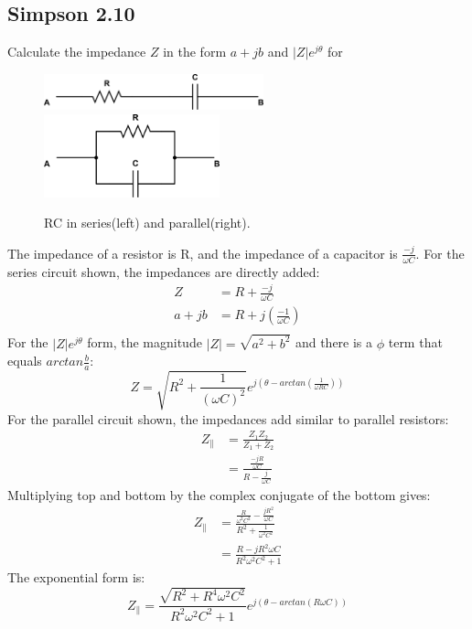 \documentclass[a4paper,12pt]{article}
\newcommand{\F}[2]{\ensuremath{\frac{#1}{#2}}}
\newcommand{\LP}{\left(}
\newcommand{\RP}{\right)}
\begin{document}
\subsection*{Simpson 2.10}
Calculate the impedance $Z$ in the form $a+jb$ and $|Z|e^{j\theta}$ for\\
\begin{figure}[H]
\centering
\includegraphics[width=2.5in]{sam_lab2/simpson_rc_series.png}
\includegraphics[width=2in]{sam_lab2/simpson_rc_parallel.png}
\caption{RC in series(left) and parallel(right).}
\end{figure}
\noindent
The impedance of a resistor is R, and the impedance of a capacitor is $\F{-j}{\omega C}$.  For the series circuit shown, the impedances are directly added:
\begin{align*}
Z&=R+\F{-j}{\omega C}\\
a+jb&=R+j\LP\F{-1}{\omega C}\RP\\
\end{align*}
For the $|Z|e^{j\theta}$ form, the magnitude $|Z|= \sqrt{a^2+b^2}$ and there is a $\phi$ term that equals $arctan{\F{b}{a}}$:
\[Z=\sqrt{R^2+\F{1}{(\omega C)^2}}e^{j(\theta-arctan\LP\F{1}{\omega RC}\RP)}\]
For the parallel circuit shown, the impedances add similar to parallel resistors:
\begin{align*}
Z_\parallel&=\F{Z_1Z_2}{Z_1+Z_2}\\
&=\F{\F{-jR}{\omega C}}{R-\F{j}{\omega C}}
\end{align*}
Multiplying top and bottom by the complex conjugate of the bottom gives:
\begin{align*}
Z_\parallel&=\F{\F{R}{\omega^2C^2}-\F{jR^2}{\omega C}}{R^2+\F{1}{\omega^2C^2}}\\
&=\F{R-jR^2\omega C}{R^2\omega^2C^2+1}
\end{align*}
The exponential form is:
\[Z_\parallel=\F{\sqrt{R^2+R^4\omega^2C^2}}{R^2\omega^2C^2+1}e^{j(\theta-arctan(R\omega C))}\]
\end{document}
